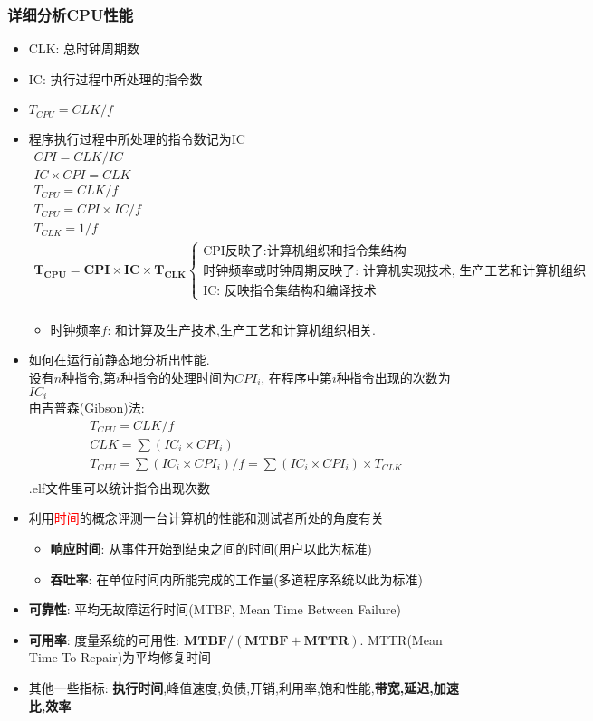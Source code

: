 \documentclass[UTF8]{article}
\newcommand{\itemblt}{\item[$\bullet$]}
\newcommand{\itemc}{\item[$\circ$]}
\begin{document}
\subsubsection{详细分析CPU性能}
\begin{itemize}
	\itemblt CLK: 总时钟周期数
	\itemblt IC: 执行过程中所处理的指令数
	\itemblt $T_{CPU}=CLK/f$
	
	\itemblt 程序执行过程中所处理的指令数记为IC
	$$
	\begin{array}{l}
	CPI=CLK/IC\\
	IC\times CPI=CLK\\
	T_{CPU}=CLK/f\\
	T_{CPU}=CPI\times IC/f\\
	T_{CLK}=1/f\\
	\bm{T_{CPU}=CPI\times IC\times T_{CLK}}\left\{\begin{array}{l}\mbox{CPI反映了:计算机组织和指令集结构}\\\mbox{时钟频率或时钟周期反映了: 计算机实现技术, 生产工艺和计算机组织}\\\mbox{IC: 反映指令集结构和编译技术}\end{array}\right.\\
	\end{array}
	$$
	\begin{itemize}
		\itemc 时钟频率$f$: 和计算及生产技术,生产工艺和计算机组织相关.
	\end{itemize}

	\itemblt 如何在运行前静态地分析出性能.\\
	设有$n$种指令,第$i$种指令的处理时间为$CPI_i$, 在程序中第$i$种指令出现的次数为$IC_i$\\
	由吉普森(Gibson)法:
	$$
	\begin{array}{l}
	T_{CPU}=CLK/f\\
	CLK=\sum(IC_i\times CPI_i)\\
	T_{CPU}=\sum(IC_i\times CPI_i)/f=\sum(IC_i\times CPI_i)\times T_{CLK}\\
	\end{array}
	$$
	.elf文件里可以统计指令出现次数
	
	\itemblt 利用\textcolor{red}{时间}的概念评测一台计算机的性能和测试者所处的角度有关
	\begin{itemize}
		\itemc \textbf{响应时间}: 从事件开始到结束之间的时间(用户以此为标准)
		\itemc \textbf{吞吐率}: 在单位时间内所能完成的工作量(多道程序系统以此为标准)
	\end{itemize}

	\itemblt \textbf{可靠性}: 平均无故障运行时间(MTBF, Mean Time Between Failure)
	\itemblt \textbf{可用率}: 度量系统的可用性: $\bm{MTBF/(MTBF+MTTR)}$. MTTR(Mean Time To Repair)为平均修复时间
	\itemblt 其他一些指标: \textbf{执行时间},峰值速度,负债,开销,利用率,饱和性能,\textbf{带宽,延迟,加速比,效率}

	
\end{itemize}
\end{document}
